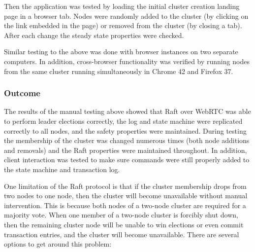 \documentclass[9pt]{extarticle}
\begin{document}
\begin{multicols}{2}
Then the application was tested by loading the initial cluster
creation landing page in a browser tab. Nodes were randomly added to
the cluster (by clicking on the link embedded in the page) or removed
from the cluster (by closing a tab). After each change the steady
state properties were checked.

Similar testing to the above was done with browser instances on two
separate computers. In addition, cross-browser functionality was
verified by running nodes from the same cluster running simultaneously
in Chrome 42 and Firefox 37.


\subsubsection{Outcome}

The results of the manual testing above showed that Raft over WebRTC
was able to perform leader elections correctly, the log and state
machine were replicated correctly to all nodes, and the safety
properties were maintained. During testing the membership of the
cluster was changed numerous times (both node additions and removals)
and the Raft properties were maintained throughout. In addition,
client interaction was tested to make sure commands were still
properly added to the state machine and transaction log.

One limitation of the Raft protocol is that if the cluster membership drops from
two nodes to one node, then the cluster will become unavailable without manual
intervention. This is because both nodes of a two-node cluster are required for
a majority vote.  When one member of a two-node cluster is forcibly shut down,
then the remaining cluster node will be unable to win elections or even commit
transaction entries, and the cluster will become unavailable. There are several
options to get around this problem:



\end{multicols}
\end{document}
